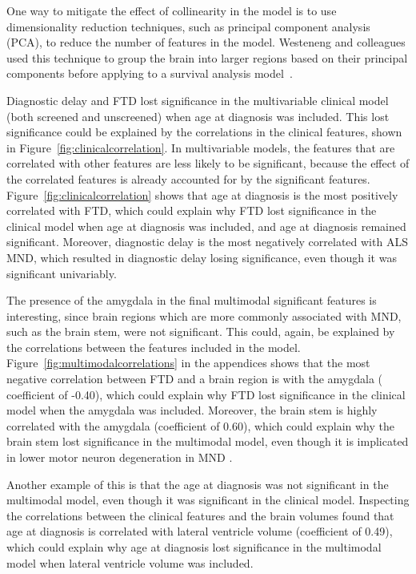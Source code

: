 One way to mitigate the effect of collinearity in the model is to use dimensionality reduction techniques, such as principal component analysis (PCA), to reduce the number of features in the model.
Westeneng and colleagues used this technique to group the brain into larger regions based on their principal components before applying to a survival analysis model~\cite{westenengSubcorticalStructuresAmyotrophic2015}.

Diagnostic delay and FTD lost significance in the multivariable clinical model (both screened and unscreened) when age at diagnosis was included.
This lost significance could be explained by the correlations in the clinical features, shown in Figure~\ref{fig:clinicalcorrelation}.
In multivariable models, the features that are correlated with other features are less likely to be significant, because the effect of the correlated features is already accounted for by the significant features.
Figure~\ref{fig:clinicalcorrelation} shows that age at diagnosis is the most positively correlated with FTD, which could explain why FTD lost significance in the clinical model when age at diagnosis was included, and age at diagnosis remained significant.
Moreover, diagnostic delay is the most negatively correlated with ALS MND, which resulted in diagnostic delay losing significance, even though it was significant univariably.

The presence of the amygdala in the final multimodal significant features is interesting, since brain regions which are more commonly associated with MND, such as the brain stem, were not significant.
This could, again, be explained by the correlations between the features included in the model.
Figure~\ref{fig:multimodalcorrelations} in the appendices shows that the most negative correlation between FTD and a brain region is with the amygdala (
coefficient of -0.40), which could explain why FTD lost significance in the clinical model when the amygdala was included.
Moreover, the brain stem is highly correlated with the amygdala (coefficient of 0.60), which could explain why the brain stem lost significance in the multimodal model, even though it is implicated in lower motor neuron degeneration in MND .

Another example of this is that the age at diagnosis was not significant in the multimodal model, even though it was significant in the clinical model.
Inspecting the correlations between the clinical features and the brain volumes found that age at diagnosis is correlated with lateral ventricle volume (coefficient of 0.49), which could explain why age at diagnosis lost significance in the multimodal model when lateral ventricle volume was included.

